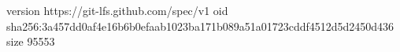 version https://git-lfs.github.com/spec/v1
oid sha256:3a457dd0af4e16b6b0efaab1023ba171b089a51a01723cddf4512d5d2450d436
size 95553
